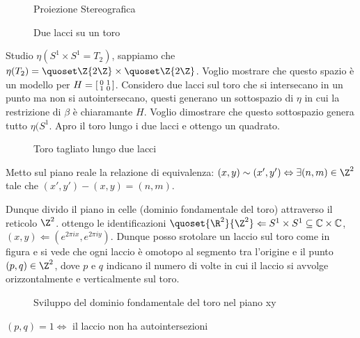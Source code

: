 \begin{figure}
	\centering 
	
	\caption{Proiezione Stereografica}
\end{figure}


\begin{figure}
	\centering 
	
	\caption{Due lacci su un toro}
\end{figure}

Studio $\eta(S^{1} \times S^{1} = T_{2})$, sappiamo che $\eta(T_{2}) = \quoset\Z{2\Z} \times \quoset\Z{2\Z}$. Voglio mostrare che questo spazio è un modello per
$H = \begin{bsmallmatrix} 0 & 1 \\ 1 & 0 \end{bsmallmatrix}$. Considero due lacci sul toro che si intersecano in un punto ma non si autointersecano, questi generano un sottospazio di $\eta$ 
in cui la restrizione di $\beta$ è chiaramante $H$. Voglio dimostrare che questo sottospazio genera tutto $\eta(S^{1}$. Apro il toro lungo i due lacci e ottengo un quadrato. 

\begin{figure}
	\centering 
	
	\caption{Toro tagliato lungo due lacci}
\end{figure}

Metto sul piano reale la relazione di equivalenza: $(x, y) \sim (x', y') \Leftrightarrow \exists (n,m) \in \Z^2$ tale che $ (x',y')-(x,y) = (n, m)$.


Dunque divido il piano in celle (dominio fondamentale del toro) attraverso il reticolo $\Z^2$. ottengo le identificazioni 
$\quoset{\R^2}{\Z^2} \Leftarrow S^{1} \times S^{1} \subseteq \mathbb{C} \times \mathbb{C}$, $(x, y) \Leftarrow (e^{2 \pi i x}, e^{2 \pi i y})$.
Dunque posso srotolare un laccio sul toro come in figura e si vede che ogni laccio è omotopo al segmento tra l'origine e il punto $(p, q) \in \Z^2$, dove $p$ e $q$ indicano il
numero di volte in cui il laccio si avvolge orizzontalmente e verticalmente sul toro. 


\begin{figure}
	\centering 
	
	\caption{Sviluppo del dominio fondamentale del toro nel piano xy}
\end{figure}


\begin{teo} 
 $(p, q) =1 \iff $  il laccio non ha autointersezioni
\end{teo}

